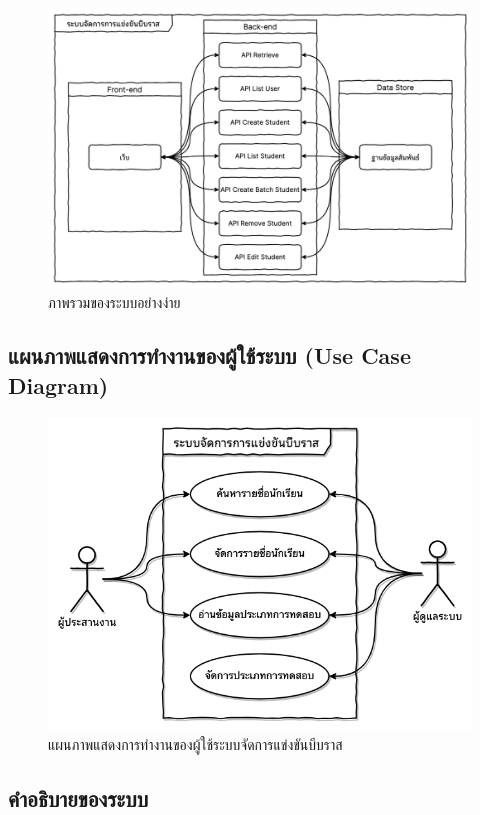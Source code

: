 \begin{figure}[ht]
    \centering
    \includegraphics[width=120mm,scale=1.0]{diagrams/system-overview-diagram.png}
    \caption{ภาพรวมของระบบอย่างง่าย}
    \label{fig:system-overview-diagram}
\end{figure}

\subsection{แผนภาพแสดงการทำงานของผู้ใช้ระบบ (Use Case Diagram)}

\begin{figure}[ht]
    \centering
    \includegraphics[width=120mm,scale=1.0]{diagrams/use-case-diagram.png}
    \caption{แผนภาพแสดงการทำงานของผู้ใช้ระบบจัดการแข่งขันบีบราส}
    \label{fig:use-case-diagram}
\end{figure}
\subsection{คำอธิบายของระบบ}

